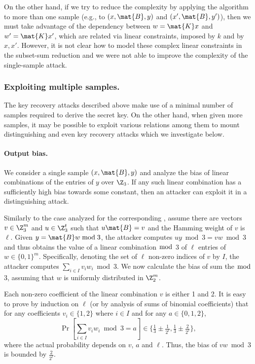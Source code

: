 On the other hand, if we try to reduce the complexity by applying the algorithm to more than one sample (e.g., to $(x,\mat{B},y)$ and $(x',\mat{B},y')$), then we must take advantage of the dependency between $w = \mat{K} x$ and $w' = \mat{K} x'$, which are related via linear constraints, imposed by $k$ and by $x,x'$. However, it is not clear how to model these complex linear constraints in the subset-sum reduction and we were not able to improve the complexity of the single-sample attack.

\subsubsection{Exploiting multiple samples.}
The key recovery attacks described above make use of a minimal number of samples required to derive the secret key. On the other hand, when given more samples, it may be possible to exploit various relations among them to mount distinguishing and even key recovery attacks which we investigate below.

\paragraph{Output bias.}
We consider a single sample $(x,\mat{B},y)$ and analyze the bias of linear combinations of the entries of $y$ over $\Z_3$.
If any such linear combination has a sufficiently high bias towards some constant,
then an attacker can exploit it in a distinguishing attack.

Similarly to the case analyzed for the corresponding \ttOWF, assume there are vectors $v \in \Z_3^m$ and $u \in \Z_3^t$ such that $u \mat{B} = v$ and the Hamming weight of $v$ is $\ell$. Given $y = \mat{B}w \bmod 3$, the attacker computes $uy \bmod 3 = vw \bmod 3$ and thus obtains the value of a linear combination $\bmod$ 3 of $\ell$ entries of $w \in \{0,1\}^m$.
Specifically, denoting the set of $\ell$ non-zero indices of $v$ by $I$, the attacker computes $\sum_{i \in I} v_i w_i \bmod 3$.
We now calculate the bias of sum the $\bmod $ 3, assuming that $w$ is uniformly distributed in $\Z_2^m$.

Each non-zero coefficient of the linear combination $v$ is either 1 and 2.
It is easy to prove by induction on $\ell$ (or by analysis of sums of binomial coefficients) that
for any coefficients $v_i \in \{1,2\}$ where $i \in I$ and for any $a \in \{0,1,2\}$,
$$\Pr\left[\sum_{i \in I} v_i w_i \bmod 3 = a\right] \in \{\tfrac{1}{3} \pm \tfrac{1}{2^\ell}, \tfrac{1}{3} \pm \tfrac{2}{2^\ell}\},$$
where the actual probability depends on $v$, $a$ and $\ell$. Thus, the bias of $vw \bmod 3$ is bounded by $\tfrac{2}{2^\ell}$.

